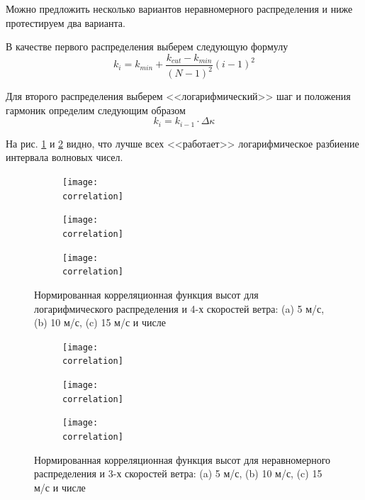 Можно предложить несколько вариантов неравномерного распределения и ниже
протестируем два варианта.

В качестве первого распределения выберем следующую формулу
\begin{equation}
    k_i = k_{min} + \frac{k_{cut} - k_{min}}{(N-1)^2} (i-1)^2
\end{equation}

Для второго распределения выберем <<логарифмический>> шаг и положения гармоник
определим следующим образом
\begin{equation}
    k_i = k_{i-1} \cdot \Delta  \kappa
\end{equation}

На рис. \ref{fig:corr_h_quad} и \ref{fig:corr_h_log} видно, что лучше всех
<<работает>> логарифмическое разбиение интервала волновых чисел.
\begin{figure}[ht]
    \centering
    \begin{subfigure}{0.49\linewidth}
        \centering
        \texttt{[image: \\correlation]}
    \end{subfigure}
    \hfill
    \begin{subfigure}{0.49\linewidth}
        \centering
        \texttt{[image: \\correlation]}
    \end{subfigure}
    \begin{subfigure}{0.49\linewidth}
        \centering
        \texttt{[image: \\correlation]}
    \end{subfigure}
    \caption{Нормированная корреляционная функция высот для логарифмического распределения и
    4-х скоростей ветра: (a) 5 м/с,  (b) 10 м/с, (c) 15 м/с и числе}
    \label{fig:corr_h_quad}
\end{figure}


\begin{figure}[ht]
    \centering
    \begin{subfigure}{0.49\linewidth}
        \centering
        \texttt{[image: \\correlation]}
    \end{subfigure}
    \hfill
    \begin{subfigure}{0.49\linewidth}
        \centering
        \texttt{[image: \\correlation]}
    \end{subfigure}
    \begin{subfigure}{0.49\linewidth}
        \centering
        \texttt{[image: \\correlation]}
    \end{subfigure}
    \caption{Нормированная корреляционная функция высот для неравномерного распределения и
    3-х скоростей ветра: (a) 5 м/с,  (b) 10 м/с, (c) 15 м/с и числе}
    \label{fig:corr_h_log}
\end{figure}

